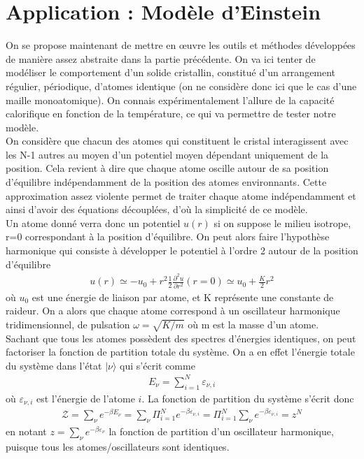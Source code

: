 \documentclass[12pt,prb,aps,epsf]{article}
\begin{document}
\section{Application : Modèle d'Einstein}

On se propose maintenant de mettre en œuvre les outils et méthodes développées de manière assez abstraite dans la partie précédente. On va ici tenter de modéliser le comportement d'un solide cristallin, constitué d'un arrangement régulier, périodique, d'atomes identique (on ne considère donc ici que le cas d'une maille monoatomique). On connais expérimentalement l'allure de la capacité calorifique en fonction de la température, ce qui va permettre de tester notre modèle.\\

On considère que chacun des atomes qui constituent le cristal interagissent avec les N-1 autres au moyen d'un potentiel moyen dépendant uniquement de la position. Cela revient à dire que chaque atome oscille autour de sa position d'équilibre indépendamment de la position des atomes environnants. Cette approximation assez violente permet de traiter chaque atome indépendamment et ainsi d'avoir des équations découplées, d'où la simplicité de ce modèle.\\

Un atome donné verra donc un potentiel $u(r)$ si on suppose le milieu isotrope, r=0 correspondant à la position d'équilibre. On peut alors faire l'hypothèse harmonique qui consiste à développer le potentiel à l'ordre 2 autour de la position d'équilibre 
\begin{eqnarray}
u(r) \simeq -u_0 + r^2\frac{1}{2}\frac{\partial^2 u}{\partial r^2}(r=0) \simeq u_0 + \frac{K}{2} r^2
\end{eqnarray}
où $u_0$ est une énergie de liaison par atome, et K représente une constante de raideur. On a alors que chaque atome correspond à un oscillateur harmonique tridimensionnel, de pulsation $\omega =\sqrt{K/m}$ où m est la masse d'un atome.\\

Sachant que tous les atomes possèdent des spectres d'énergies identiques, on peut factoriser la fonction de partition totale du système. On a en effet l'énergie totale du système dans l'état $|\nu\rangle$ qui s'écrit comme 
\begin{eqnarray}
E_{\nu} = \sum_{i=1}^{N} \varepsilon_{\nu,i}
\end{eqnarray} 
où $\varepsilon_{\nu,i}$ est l'énergie de l'atome $i$. La fonction de partition du système s'écrit donc 
\begin{eqnarray}
\mathcal{Z} = \sum_{\nu} e^{-\beta E_{\nu}} = \sum_{\nu} \Pi_{i=1}^Ne^{-\beta \varepsilon_{\nu,i}} = \Pi_{i=1}^N \sum_{\nu}e^{-\beta \varepsilon_{\nu,i}} = z^N
\end{eqnarray}
en notant $z=\sum_{\nu}e^{-\beta \varepsilon_{\nu}}$ la fonction de partition d'un oscillateur harmonique, puisque tous les atomes/oscillateurs sont identiques.\\
\end{document}
